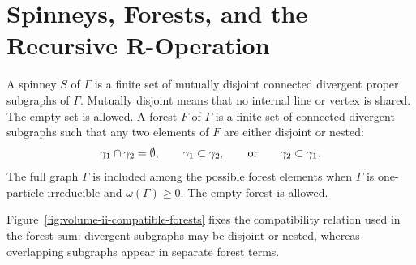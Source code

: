 \section{Spinneys, Forests, and the Recursive R-Operation}

\begin{definition}
A spinney \(S\) of \(\Gamma\) is a finite set of mutually disjoint connected
divergent proper subgraphs of \(\Gamma\).  Mutually disjoint means that no
internal line or vertex is shared.  The empty set is allowed.  A forest \(F\)
of \(\Gamma\) is a finite set of connected divergent subgraphs such that any
two elements of \(F\) are either disjoint or nested:
\[
  \gamma_1\cap\gamma_2=\emptyset,
  \qquad
  \gamma_1\subset\gamma_2,
  \qquad
  \hbox{or}
  \qquad
  \gamma_2\subset\gamma_1 .
\]
The full graph \(\Gamma\) is included among the possible forest elements when
\(\Gamma\) is one-particle-irreducible and \(\omega(\Gamma)\ge0\).  The empty
forest is allowed.
\end{definition}

Figure~\ref{fig:volume-ii-compatible-forests} fixes the compatibility relation
used in the forest sum: divergent subgraphs may be disjoint or nested, whereas
overlapping subgraphs appear in separate forest terms.

